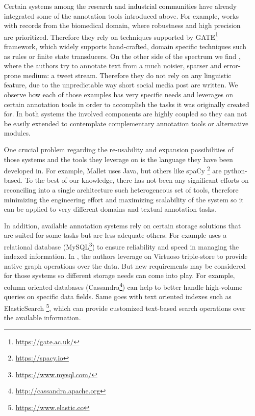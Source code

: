 Certain systems among the research and industrial communities have already integrated some of the annotation tools introduced above. For example, \cite{gate2013} works with records from the biomedical domain, where robustness and high precision are prioritized. Therefore they rely on techniques supported by  GATE\footnote{\url{https://gate.ac.uk/}} framework, which widely supports hand-crafted, domain specific techniques such as rules or finite state transducers. On the other side of the spectrum we find \cite{chielang2012}, where the authors try to annotate text from a much noisier, sparser and error-prone medium: a tweet stream. Therefore they do not rely on any linguistic feature, due to the unpredictable way short social media post are written. We observe how each of those examples has very specific needs and leverages on certain annotation tools in order to accomplish the tasks it was originally created for. In both systems the involved components are highly coupled so they can not be easily extended to contemplate complementary annotation tools or alternative modules. 
 
One crucial problem regarding the re-usability and expansion possibilities of those systems and the tools they leverage on is the language they have been developed in. For example, Mallet uses Java, but others like spaCy \footnote{\url{https://spacy.io}} are python-based. To the best of our knowledge, there has not been any significant efforts on reconciling into a single architecture such heterogeneous set of tools, therefore minimizing the engineering effort and maximizing scalability of the system so it can be applied to very different domains and textual annotation tasks.

In addition, available annotation systems rely on certain storage solutions that are suited for some tasks but are less adequate others. For example \cite{furlong2008osirisv1} uses a relational database (MySQL\footnote{\url{https://www.mysql.com/}}) to ensure reliability and speed in managing the indexed information. In \cite{rizzo20153cixty},  the authors leverage on Virtuoso triple-store to provide native graph operations over the data. But new requirements may be considered for those systems so different storage needs can come into play.  For example, column oriented databases (Cassandra\footnote{\url{http://cassandra.apache.org}}) can help to better handle high-volume queries on specific data fields. Same goes with text oriented indexes such as ElasticSearch \footnote{\url{https://www.elastic.co}}, which can provide customized text-based search operations over the available information. 


